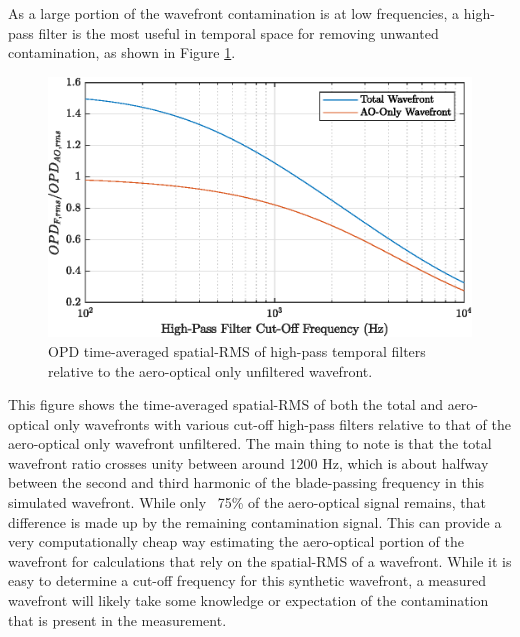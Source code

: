 As a large portion of the wavefront contamination is at low frequencies, a high-pass filter is the most useful in temporal space for removing unwanted contamination, as shown in Figure \ref{fig:04_filter_temporal}.
\begin{figure}
  \centering
  \includegraphics{../matlab/04_basic_filtering/filter_temporal.eps}
  \caption{OPD time-averaged spatial-RMS of high-pass temporal filters relative to the aero-optical only unfiltered wavefront.}
  \label{fig:04_filter_temporal}
\end{figure}
This figure shows the time-averaged spatial-RMS of both the total and aero-optical only wavefronts with various cut-off high-pass filters relative to that of the aero-optical only wavefront unfiltered.
The main thing to note is that the total wavefront ratio crosses unity between around 1200 Hz, which is about halfway between the second and third harmonic of the blade-passing frequency in this simulated wavefront.
While only ~75\% of the aero-optical signal remains, that difference is made up by the remaining contamination signal.
This can provide a very computationally cheap way estimating the aero-optical portion of the wavefront for calculations that rely on the spatial-RMS of a wavefront.
While it is easy to determine a cut-off frequency for this synthetic wavefront, a measured wavefront will likely take some knowledge or expectation of the contamination that is present in the measurement.

